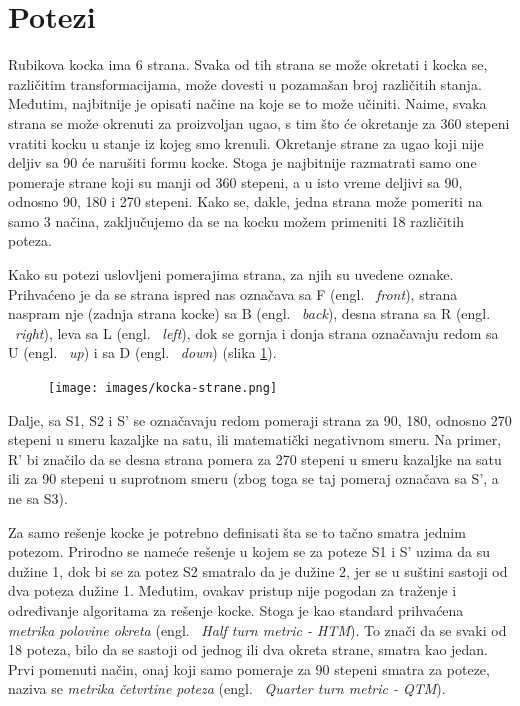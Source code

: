 \documentclass[a4paper]{article}
\begin{document}
\pagebreak
\section{Potezi}	
\label{sec:potezi}

Rubikova kocka ima 6 strana. Svaka od tih strana se može okretati i kocka se, različitim transformacijama, može dovesti u pozamašan broj različitih stanja. Međutim, najbitnije je opisati načine na koje se to može učiniti. Naime, svaka strana se može okrenuti za proizvoljan ugao, s tim što će okretanje za 360 stepeni vratiti kocku u stanje iz kojeg smo krenuli. Okretanje strane za ugao koji nije deljiv sa 90 će narušiti formu kocke. Stoga je najbitnije razmatrati samo one pomeraje strane koji su manji od 360 stepeni, a u isto vreme deljivi sa 90, odnosno 90, 180 i 270 stepeni. Kako se, dakle, jedna strana može pomeriti na samo 3 načina, zaključujemo da se na kocku možem primeniti 18 različitih poteza.

Kako su potezi uslovljeni pomerajima strana, za njih su uvedene oznake. Prihvaćeno je da se strana ispred nas označava sa F (engl. ~{\em front}), strana naspram nje (zadnja strana kocke) sa B (engl. ~{\em back}), desna strana sa R (engl. ~{\em right}), leva sa L (engl. ~{\em left}), dok se gornja i donja strana označavaju redom sa U (engl. ~{\em up}) i sa D (engl. ~{\em down}) (slika \ref{fig:stranekocke}).

\begin{figure}[h!]
        \centering\texttt{[image: images/kocka-strane.png]} 
        \caption{}
        \label{fig:stranekocke}
\end{figure}

Dalje, sa S1, S2 i S' se označavaju redom pomeraji strana za 90, 180, odnosno 270 stepeni u smeru kazaljke na satu, ili matematički negativnom smeru. Na primer, R' bi značilo da se desna strana pomera za 270 stepeni u smeru kazaljke na satu ili za 90 stepeni u suprotnom smeru (zbog toga se taj pomeraj označava sa S', a ne sa S3).

Za samo rešenje kocke je potrebno definisati šta se to tačno smatra jednim potezom. Prirodno se nameće rešenje u kojem se za poteze S1 i S' uzima da su dužine 1, dok bi se za potez S2 smatralo da je dužine 2, jer se u suštini sastoji od dva poteza dužine 1. Međutim, ovakav pristup nije pogodan za traženje i određivanje algoritama za rešenje kocke. Stoga je kao standard prihvaćena \emph{metrika polovine okreta} (engl. ~{\em Half turn metric - HTM}). To znači da se svaki od 18 poteza, bilo da se sastoji od jednog ili dva okreta strane, smatra kao jedan. Prvi pomenuti način, onaj koji samo pomeraje za 90 stepeni smatra za poteze, naziva se \emph{metrika četvrtine poteza} (engl. ~{\em Quarter turn metric - QTM}). 
\end{document}
